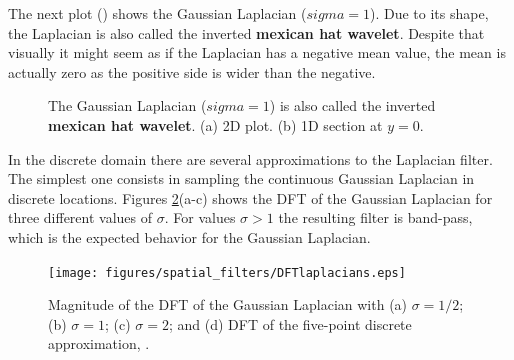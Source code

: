 The next plot (\fig{\ref{fig:mexican_hat_wavelet}}) shows the Gaussian Laplacian ($sigma = 1$). Due to its shape, the Laplacian is also called the inverted {\bf mexican hat wavelet}. Despite that visually it might seem as if the Laplacian has a negative mean value, the mean is actually zero as the positive side is wider than the negative.

\begin{figure}[h]
	\centerline{
	}
	\caption{The Gaussian Laplacian ($sigma = 1$) is also called the inverted {\bf mexican hat wavelet}. (a) 2D plot. (b) 1D section at $y=0$.}
	\label{fig:mexican_hat_wavelet}
\end{figure}



In the discrete domain there are several approximations to the Laplacian filter. The simplest one consists in sampling the continuous Gaussian Laplacian in discrete locations.
Figures {\ref{fig:DFTlaplacians}}(a-c) shows the DFT of the Gaussian Laplacian for three different values of $\sigma$. For values $\sigma>1$ the resulting filter is band-pass, which is the expected behavior for the Gaussian Laplacian. %

\begin{figure}[h!]
	\centerline{
		\texttt{[image: figures/spatial\_filters/DFTlaplacians.eps]}}
	\caption{Magnitude of the DFT of the Gaussian Laplacian with (a) $\sigma=1/2$; (b) $\sigma=1$; (c) $\sigma=2$; and (d) DFT of the five-point discrete approximation, \eqn{\ref{eq:five_point_laplacian}}.
	}
	\label{fig:DFTlaplacians}
\end{figure}

